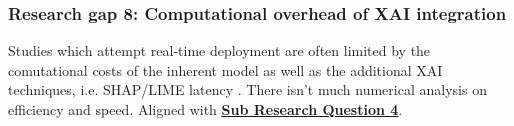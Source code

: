 
\subsubsection*{Research gap 8: Computational overhead of XAI integration}\label{research-gap-8}
Studies which attempt real-time deployment are often limited by the comutational costs of the inherent model as well as the additional XAI techniques, i.e. SHAP/LIME latency \citep{kapoor2024comparative}. There isn't much numerical analysis on efficiency and speed. Aligned with \hyperref[sub-research-q4]{\uline{\textbf{Sub Research Question 4}}}.


